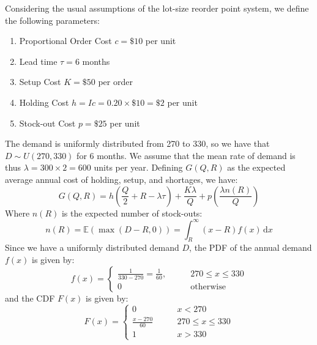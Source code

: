 \documentclass[12pt]{article}
\begin{document}

Considering the usual assumptions of the lot-size reorder point system, we define the following parameters: \begin{enumerate}
    \item Proportional Order Cost $c = \$10$ per unit 
    \item Lead time $\tau = 6$ months 
    \item Setup Cost $K = \$50$ per order
    \item Holding Cost $h = Ic =  0.20 \times \$10  = \$2$ per unit
    \item Stock-out Cost $p = \$25$ per unit 
\end{enumerate} The demand is uniformly distributed from 270 to 330, so we have that $D \sim U(270, 330)$ for 6 months. We assume that the mean rate of demand is thus $\lambda = 300 \times 2 = 600$ units per year. Defining $G(Q,R)$ as the expected average annual cost of holding, setup, and shortages, we have: \begin{equation}
    G(Q,R) = h\left( \frac{Q}{2} + R - \lambda \tau \right) + \frac{K\lambda}{Q} + p\left( \frac{\lambda n(R)}{Q} \right)
\end{equation} Where $n(R)$ is the expected number of stock-outs: \begin{equation}\label{eq:2-nr}
    n(R) = \mathbb{E}(\max (D-R, 0)) = \int_{R}^{\infty} (x - R)f(x) \, \mathrm{d}x
\end{equation} Since we have a uniformly distributed demand $D$, the PDF of the annual demand $f(x)$ is given by: \begin{equation*}
    f(x) = \begin{cases}
        \displaystyle\frac{1}{330 - 270} = \frac{1}{60}, \qquad & 270 \leq x \leq 330 \\ 
        0 \qquad & \text{otherwise}
    \end{cases}
\end{equation*} and the CDF $F(x)$ is given by: \begin{equation*}
    F(x) = \begin{cases}
        0 \qquad & x < 270 \\ 
        \displaystyle\frac{x-270}{60} \qquad & 270\leq x\leq 330 \\ 
        1 \qquad & x > 330 
    \end{cases}
\end{equation*}
\end{document}
